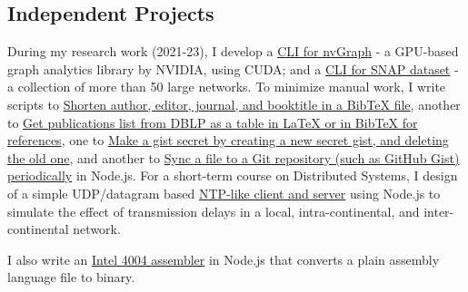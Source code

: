 \subsection{Independent Projects}

During my research work (2021-23), I develop a \href{https://github.com/nodef/nvgraph.sh}{CLI for nvGraph} - a GPU-based graph analytics library by NVIDIA, using CUDA; and a \href{https://github.com/nodef/snap-data.sh}{CLI for SNAP dataset} - a collection of more than 50 large networks. To minimize manual work, I write scripts to \href{https://github.com/javascriptf/script-minify-bibtex}{Shorten author, editor, journal, and booktitle in a BibTeX file}, another to \href{https://github.com/javascriptf/script-publications-list}{Get publications list from DBLP as a table in LaTeX or in BibTeX for references}, one to \href{https://github.com/javascriptf/script-gist-conceal}{Make a gist secret by creating a new secret gist, and deleting the old one}, and another to \href{https://github.com/javascriptf/script-git-sync-file}{Sync a file to a Git repository (such as GitHub Gist) periodically} in Node.js. For a short-term course on Distributed Systems, I design of a simple UDP/datagram based \href{https://github.com/javascriptf/nodejs-time-server}{NTP-like client and server} using Node.js to simulate the effect of transmission delays in a local, intra-continental, and inter-continental network. I also write an \href{https://github.com/javascriptf/nodejs-4004-assembler}{Intel 4004 assembler} in Node.js that converts a plain assembly language file to binary.

